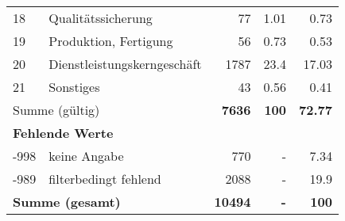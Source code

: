 \begin{longtable}{lXrrr}
        18 & \multicolumn{1}{X}{Qualitätssicherung} & %
          \num{77} &
          \num[round-mode=places,round-precision=2]{1,01} &
          \num[round-mode=places,round-precision=2]{0,73} \\

        19 & \multicolumn{1}{X}{Produktion, Fertigung} & %
          \num{56} &
          \num[round-mode=places,round-precision=2]{0,73} &
          \num[round-mode=places,round-precision=2]{0,53} \\

        20 & \multicolumn{1}{X}{Dienstleistungskerngeschäft} & %
          \num{1787} &
          \num[round-mode=places,round-precision=2]{23,4} &
          \num[round-mode=places,round-precision=2]{17,03} \\

        21 & \multicolumn{1}{X}{Sonstiges} & %
          \num{43} &
          \num[round-mode=places,round-precision=2]{0,56} &
          \num[round-mode=places,round-precision=2]{0,41} \\

     \midrule
     \multicolumn{2}{l}{Summe (gültig)} &
       \textbf{\num{7636}} &
     \textbf{100} &
       \textbf{\num[round-mode=places,round-precision=2]{72,77}} \\
     \multicolumn{5}{l}{\textbf{Fehlende Werte}}\\
       -998 &
       keine Angabe &
         \num{770} &
        - &
         \num[round-mode=places,round-precision=2]{7,34} \\
       -989 &
       filterbedingt fehlend &
         \num{2088} &
        - &
         \num[round-mode=places,round-precision=2]{19,9} \\
     \midrule
     \multicolumn{2}{l}{\textbf{Summe (gesamt)}} &
          \textbf{\num{10494}} &
        \textbf{-} &
        \textbf{100} \\
     \bottomrule
     \end{longtable}
     

